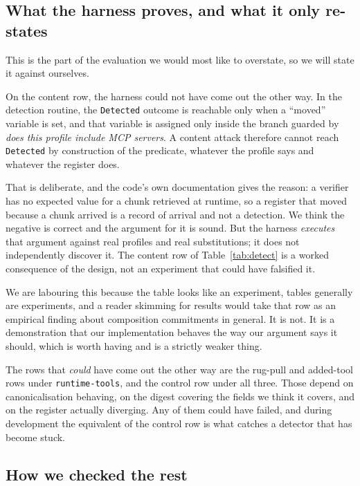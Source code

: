 \documentclass[11pt]{article}
\begin{document}
\subsection{What the harness proves, and what it only re-states}
\label{sec:harness-honest}

This is the part of the evaluation we would most like to overstate, so we will
state it against ourselves.

On the content row, the harness could not have come out the other way. In the
detection routine, the \texttt{Detected} outcome is reachable only when a
``moved'' variable is set, and that variable is assigned only inside the
branch guarded by \emph{does this profile include MCP servers}. A content
attack therefore cannot reach \texttt{Detected} by construction of the
predicate, whatever the profile says and whatever the register does.

That is deliberate, and the code's own documentation gives the reason: a
verifier has no expected value for a chunk retrieved at runtime, so a register
that moved because a chunk arrived is a record of arrival and not a detection.
We think the negative is correct and the argument for it is sound. But the
harness \emph{executes} that argument against real profiles and real
substitutions; it does not independently discover it. The content row of
Table~\ref{tab:detect} is a worked consequence of the design, not an
experiment that could have falsified it.

We are labouring this because the table looks like an experiment, tables
generally are experiments, and a reader skimming for results would take that
row as an empirical finding about composition commitments in general. It is
not. It is a demonstration that our implementation behaves the way our
argument says it should, which is worth having and is a strictly weaker thing.

The rows that \emph{could} have come out the other way are the rug-pull and
added-tool rows under \texttt{runtime-tools}, and the control row under all
three. Those depend on canonicalisation behaving, on the digest covering the
fields we think it covers, and on the register actually diverging. Any of them
could have failed, and during development the equivalent of the control row is
what catches a detector that has become stuck.

\subsection{How we checked the rest}
\end{document}
